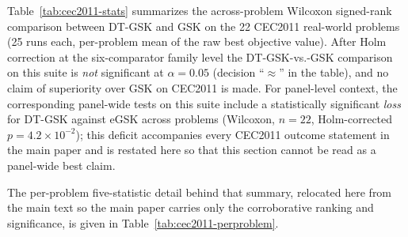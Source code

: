 \documentclass[algorithms,article,submit,moreauthors,pdftex]{Definitions/mdpi}
\newcommand{\dtgsk}{DT-GSK}
\newcommand{\egsk}{eGSK}
\begin{document}
Table~\ref{tab:cec2011-stats} summarizes the across-problem Wilcoxon
signed-rank comparison between \dtgsk{} and GSK on the 22 CEC2011
real-world problems (25 runs each, per-problem mean of the raw best
objective value).
After Holm correction at the six-comparator family level the
\dtgsk{}-vs.-GSK comparison on this suite is \emph{not} significant at
$\alpha = 0.05$ (decision ``$\approx$'' in the table), and no claim of
superiority over GSK on CEC2011 is made.
For panel-level context, the corresponding panel-wide tests on this
suite include a statistically significant \emph{loss} for \dtgsk{}
against \egsk{} across problems (Wilcoxon, $n = 22$, Holm-corrected
$p = 4.2 \times 10^{-2}$); this deficit accompanies every CEC2011
outcome statement in the main paper and is restated here so that this
section cannot be read as a panel-wide best claim.

\begin{table}[H]
\caption{Across-problem Wilcoxon signed-rank summary, \dtgsk{} vs.\ GSK
on CEC2011 ($n = 22$ problems, 25 runs each, per-problem mean of the raw
best objective): $R^{+}$, $R^{-}$, raw and Holm-corrected $p$, and
win/tie/loss counts (tie $|\Delta| < 10^{-8}$); $\alpha = 0.05$.  The
Holm-corrected decision is no significant difference.  Panel-level context: the
corresponding panel-wide tests include a significant loss to \egsk{}
(Holm-corrected $p = 4.2 \times 10^{-2}$).  }\label{tab:cec2011-stats}
\centering
\tablesize{\footnotesize}

\end{table}

The per-problem five-statistic detail behind that summary, relocated here
from the main text so the main paper carries only the corroborative ranking
and significance, is given in Table~\ref{tab:cec2011-perproblem}.

\begin{table}[p]
\caption{CEC2011 real-world suite (22 problems, native dimensions, 25 runs,
$\mathrm{MaxFES} = 150{,}000$): best / median / worst / mean / SD of the final
raw objective value for GSK vs.\ \dtgsk{}; best mean per problem in bold (raw
best-fitness basis; negative optima occur on some problems). Within the
seven-algorithm family panel on this suite, \dtgsk{} significantly loses to
\egsk{} across problems (Wilcoxon, $n = 22$, Holm $p = 4.2 \times 10^{-2}$);
these head-to-head columns show GSK vs.\ \dtgsk{} only and must not be read as
a panel-wide best claim.}\label{tab:cec2011-perproblem}
\centering
\tablesize{\footnotesize}
\resizebox{\textwidth}{!}{}
\end{table}
\end{document}
